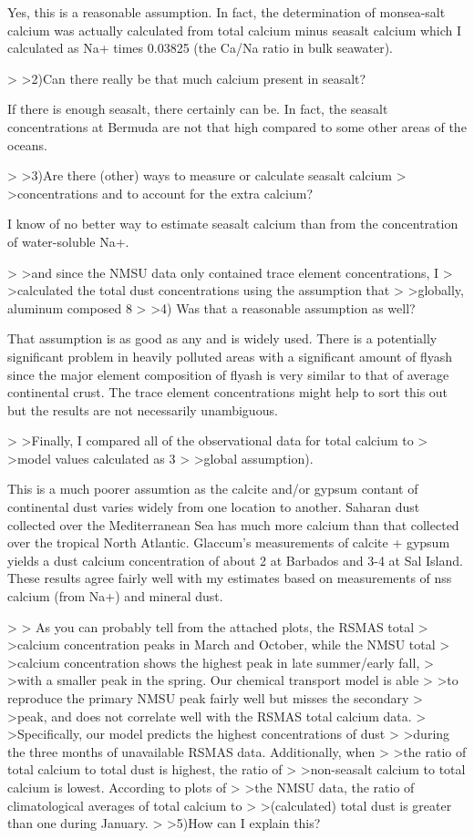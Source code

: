 \documentclass[final,dvips]{foils}
\begin{document}
{Yes, this is a reasonable assumption.  In fact, the determination of
monsea-salt calcium was actually calculated from total calcium minus
seasalt calcium which I calculated as Na+ times 0.03825 (the Ca/Na
ratio in bulk seawater). 

> >2)Can there really be that much calcium present in seasalt?

If there is enough seasalt, there certainly can be.  In fact, the
seasalt concentrations at Bermuda are not that high compared to some
other areas of the oceans. 

> >3)Are there (other) ways to measure or calculate seasalt calcium
> >concentrations and to account for the extra calcium?

I know of no better way to estimate seasalt calcium than from the
concentration of water-soluble Na+. 

> >and since the NMSU data only contained trace element concentrations, I
> >calculated the total dust concentrations using the assumption that
> >globally, aluminum composed 8%
> >4) Was that a reasonable assumption as well?

That assumption is as good as any and is widely used.  There is a
potentially significant problem in heavily polluted areas with a
significant amount of flyash since the major element composition of
flyash is very similar to that of average continental crust.  The
trace element concentrations might help to sort this out but the
results are not necessarily unambiguous. 

> >Finally, I compared all of the observational data for total calcium to
> >model values calculated as 3%
> >global assumption).

This is a much poorer assumtion as the calcite and/or gypsum contant
of continental dust varies widely from one location to another.
Saharan dust collected over the Mediterranean Sea has much more
calcium than that collected over the tropical North Atlantic.
Glaccum's measurements of calcite + gypsum yields a dust calcium
concentration of about 2 at Barbados and 3-4 at Sal Island.  These
results agree fairly well with my estimates based on measurements of
nss calcium (from Na+) and mineral dust. 

> >       As you can probably tell from the attached plots, the RSMAS total
> >calcium concentration peaks in March and October, while the NMSU total
> >calcium concentration shows the highest peak in late summer/early fall,
> >with a smaller peak in the spring.  Our chemical transport model is able
> >to reproduce the primary NMSU peak fairly well but misses the secondary
> >peak, and does not correlate well with the RSMAS total calcium data.
> >Specifically, our model predicts the highest concentrations of dust
> >during the three months of unavailable RSMAS data. Additionally, when
> >the ratio of total calcium to total dust is highest, the ratio of
> >non-seasalt calcium to total calcium is lowest. According to plots of
> >the NMSU data, the ratio of climatological averages of total calcium to
> >(calculated) total dust is greater than one during January.
> >5)How can I explain this?

}
\end{document}
